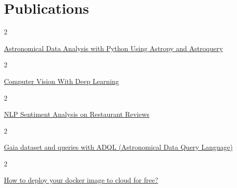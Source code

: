 \documentclass[10pt, letterpaper]{article}
\newenvironment{twocolentry}[2][]{
    \onecolentry
    \def\secondColumn{#2}
    \setcolumnwidth{\fill, 4.5 cm}
    \begin{paracol}{2}
}{
    \switchcolumn \raggedleft \secondColumn
    \end{paracol}
    \endonecolentry
} %
\begin{document}
    \section{Publications}
        \begin{samepage}
            \begin{twocolentry}{2024}
                \href{https://cevheri.medium.com/astronomical-data-analysis-with-python-using-astropy-and-astroquery-ff7857588c5f}{Astronomical Data Analysis with Python Using Astropy and Astroquery}
            \end{twocolentry}
        \end{samepage}
        \vspace{0.10 cm}

        \begin{samepage}
            \begin{twocolentry}{2024}
                \href{https://cevheri.medium.com/computer-vision-with-deep-learning-part1-b5d7a0adafe4}{Computer Vision With Deep Learning}
            \end{twocolentry}
        \end{samepage}
        \vspace{0.10 cm}

        \begin{samepage}
            \begin{twocolentry}{2024}
                \href{https://cevheri.medium.com/nlp-sentiment-analysis-on-restaurant-reviews-f85484c6c48e}{NLP Sentiment Analysis on Restaurant Reviews}
            \end{twocolentry}
        \end{samepage}
        \vspace{0.10 cm}

        \begin{samepage}
            \begin{twocolentry}{2024}
                \href{https://cevheri.medium.com/gaia-dataset-and-queries-with-adql-astronomical-data-query-language-8bbdb5a97da8}{Gaia dataset and queries with ADQL (Astronomical Data Query Language)}
            \end{twocolentry}
        \end{samepage}
        \vspace{0.10 cm}

        \begin{samepage}
            \begin{twocolentry}{2024}
                \href{https://cevheri.medium.com/how-to-deploy-your-docker-image-to-cloud-for-free-6bd1c61d01ef}{How to deploy your docker image to cloud for free?}
            \end{twocolentry}
        \end{samepage}
        \vspace{0.10 cm}
\end{document}
